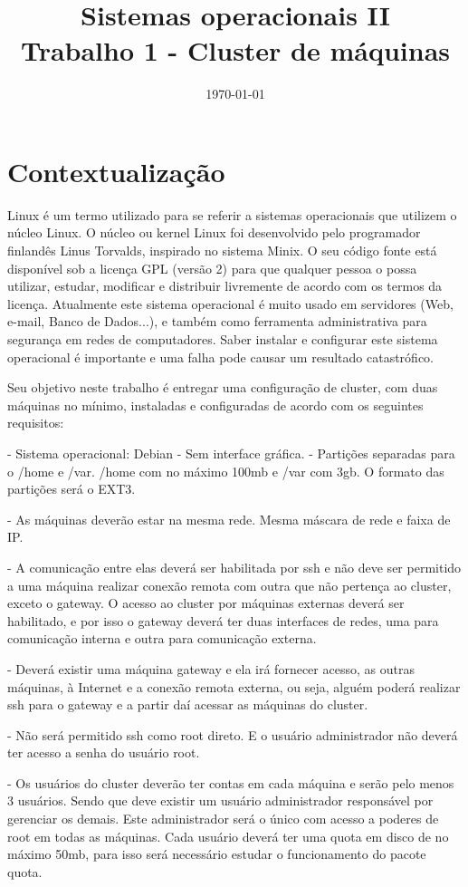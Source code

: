 \documentclass[
	12pt,				%
	openany,			%
	a4paper,			%
	chapter=TITLE,		%
	section=TITLE,		%
	english,
	brazil				%
]{abntex2}
\title{Sistemas operacionais II \\ Trabalho 1 - Cluster de máquinas}
\date{\today}
\begin{document}
\maketitle

\chapter{Contextualização}

Linux é um termo utilizado para se referir a sistemas operacionais que utilizem o núcleo Linux. O núcleo ou kernel Linux foi desenvolvido pelo programador finlandês Linus Torvalds, inspirado no sistema Minix. O seu código fonte está disponível sob a licença GPL (versão 2) para que qualquer pessoa o possa utilizar, estudar, modificar e distribuir livremente de acordo com os termos da licença. Atualmente este sistema operacional é muito usado em servidores (Web, e-mail, Banco de Dados...), e também como ferramenta administrativa para segurança em redes de computadores. Saber instalar e configurar este sistema operacional é importante e uma falha pode causar um resultado catastrófico.

Seu objetivo neste trabalho é entregar uma configuração de cluster, com duas máquinas no mínimo, instaladas e configuradas de acordo com os seguintes requisitos:

- Sistema operacional: Debian
    - Sem interface gráfica.
    - Partições separadas para o /home e /var. /home com no máximo 100mb e /var com 3gb. O formato das partições será o EXT3.

- As máquinas deverão estar na mesma rede. Mesma máscara de rede e faixa de
IP.

- A comunicação entre elas deverá ser habilitada por ssh e não deve ser permitido a uma máquina realizar conexão remota com outra que não pertença ao cluster, exceto o gateway. O acesso ao cluster por máquinas externas deverá ser habilitado, e por isso o gateway deverá ter duas interfaces de redes, uma para comunicação interna e outra para comunicação externa.

- Deverá existir uma máquina gateway e ela irá fornecer acesso, as outras máquinas, à Internet e a conexão remota externa, ou seja, alguém poderá realizar ssh para o gateway e a partir daí acessar as máquinas do cluster.

- Não será permitido ssh como root direto. E o usuário administrador não deverá ter acesso a senha do usuário root.

- Os usuários do cluster deverão ter contas em cada máquina e serão pelo menos 3 usuários. Sendo que deve existir um usuário administrador responsável por gerenciar os demais. Este administrador será o único com acesso a poderes de root em todas as máquinas. Cada usuário deverá ter uma quota em disco de no máximo 50mb, para isso será necessário estudar o funcionamento do pacote quota.
\end{document}
